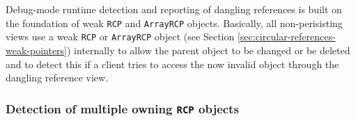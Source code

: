 \documentclass[pdf,ps2pdf,11pt]{SANDreport}
\begin{document}
Debug-mode runtime detection and reporting of dangling references is
built on the foundation of weak {}\texttt{RCP} and {}\texttt{ArrayRCP}
objects.  Basically, all non-perisisting views use a weak
{}\texttt{RCP} or {}\texttt{ArrayRCP} object (see Section
{}\ref{sec:circular-references-weak-pointers}) internally to allow the
parent object to be changed or be deleted and to detect this if a
client tries to access the now invalid object through the dangling
reference view.


%
{}\subsubsection{Detection of multiple owning {}\texttt{RCP} objects}
\label{sec:detection-dual-owning-rcps}
%

{\bsinglespace
\begin{figure}
\begin{center}

\end{center}
\end{figure}}
\end{document}
